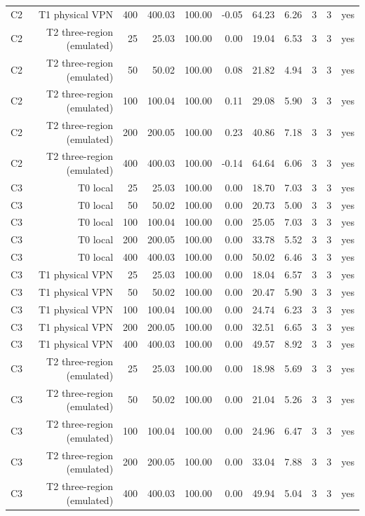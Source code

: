\begin{table}[t]
\begin{tabular}{lrrrrrrrrrr}
C2 & T1 physical VPN & 400 & 400.03 & 100.00 & -0.05 & 64.23 & 6.26 & 3 & 3 & yes \\
C2 & T2 three-region (emulated) & 25 & 25.03 & 100.00 & 0.00 & 19.04 & 6.53 & 3 & 3 & yes \\
C2 & T2 three-region (emulated) & 50 & 50.02 & 100.00 & 0.08 & 21.82 & 4.94 & 3 & 3 & yes \\
C2 & T2 three-region (emulated) & 100 & 100.04 & 100.00 & 0.11 & 29.08 & 5.90 & 3 & 3 & yes \\
C2 & T2 three-region (emulated) & 200 & 200.05 & 100.00 & 0.23 & 40.86 & 7.18 & 3 & 3 & yes \\
C2 & T2 three-region (emulated) & 400 & 400.03 & 100.00 & -0.14 & 64.64 & 6.06 & 3 & 3 & yes \\
C3 & T0 local & 25 & 25.03 & 100.00 & 0.00 & 18.70 & 7.03 & 3 & 3 & yes \\
C3 & T0 local & 50 & 50.02 & 100.00 & 0.00 & 20.73 & 5.00 & 3 & 3 & yes \\
C3 & T0 local & 100 & 100.04 & 100.00 & 0.00 & 25.05 & 7.03 & 3 & 3 & yes \\
C3 & T0 local & 200 & 200.05 & 100.00 & 0.00 & 33.78 & 5.52 & 3 & 3 & yes \\
C3 & T0 local & 400 & 400.03 & 100.00 & 0.00 & 50.02 & 6.46 & 3 & 3 & yes \\
C3 & T1 physical VPN & 25 & 25.03 & 100.00 & 0.00 & 18.04 & 6.57 & 3 & 3 & yes \\
C3 & T1 physical VPN & 50 & 50.02 & 100.00 & 0.00 & 20.47 & 5.90 & 3 & 3 & yes \\
C3 & T1 physical VPN & 100 & 100.04 & 100.00 & 0.00 & 24.74 & 6.23 & 3 & 3 & yes \\
C3 & T1 physical VPN & 200 & 200.05 & 100.00 & 0.00 & 32.51 & 6.65 & 3 & 3 & yes \\
C3 & T1 physical VPN & 400 & 400.03 & 100.00 & 0.00 & 49.57 & 8.92 & 3 & 3 & yes \\
C3 & T2 three-region (emulated) & 25 & 25.03 & 100.00 & 0.00 & 18.98 & 5.69 & 3 & 3 & yes \\
C3 & T2 three-region (emulated) & 50 & 50.02 & 100.00 & 0.00 & 21.04 & 5.26 & 3 & 3 & yes \\
C3 & T2 three-region (emulated) & 100 & 100.04 & 100.00 & 0.00 & 24.96 & 6.47 & 3 & 3 & yes \\
C3 & T2 three-region (emulated) & 200 & 200.05 & 100.00 & 0.00 & 33.04 & 7.88 & 3 & 3 & yes \\
C3 & T2 three-region (emulated) & 400 & 400.03 & 100.00 & 0.00 & 49.94 & 5.04 & 3 & 3 & yes \\

\end{tabular}
\end{table}
